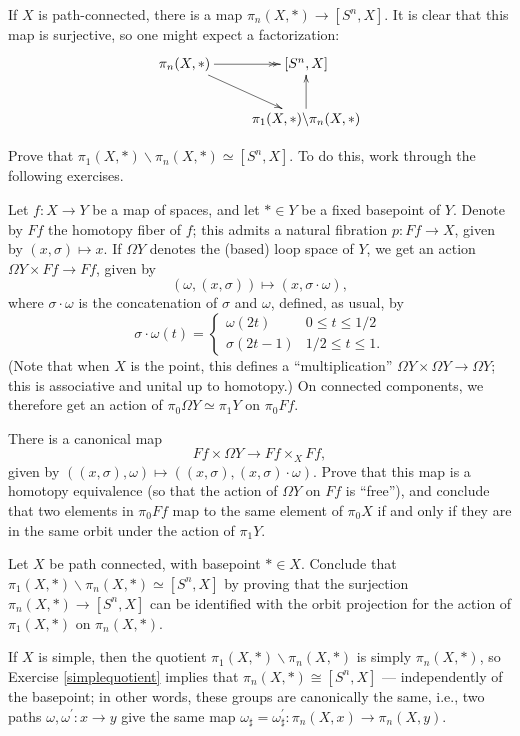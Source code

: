 If $X$ is path-connected, there is a map $\pi_n(X,\ast)\to [S^n,X]$.
It is clear that this map is surjective,
so one might expect a factorization:
\begin{equation*}
    \xymatrix{
	\pi_n(X,\ast)\ar@{->>}[r]\ar[dr] & [S^n,X]\\
	& \pi_1(X,\ast)\backslash \pi_n(X,\ast)\ar[u]
	}
\end{equation*}
\begin{exercise}\label{simplequotient}
    Prove that $\pi_1(X,\ast)\backslash \pi_n(X,\ast) \simeq [S^n, X]$.
    To do this, work through the following exercises.
    
    Let $f:X\to Y$ be a map of spaces, and let $\ast\in Y$ be a fixed basepoint of $Y$.
    Denote by $Ff$ the homotopy fiber of $f$; this admits a natural fibration $p:Ff \to X$, given by $(x,\sigma)\mapsto x$.
    If $\Omega Y$ denotes the (based) loop space of $Y$, we get an action $\Omega Y \times Ff \to Ff$, given by
    $$(\omega,(x,\sigma)) \mapsto (x,\sigma\cdot\omega),$$
    where $\sigma\cdot\omega$ is the concatenation of $\sigma$ and $\omega$, defined, as usual, by
    $$
    \sigma\cdot\omega(t) = \begin{cases}
	\omega(2t) & 0\leq t\leq 1/2\\
	\sigma(2t-1) & 1/2\leq t\leq 1.
    \end{cases}
    $$
    (Note that when $X$ is the point, this defines a ``multiplication'' $\Omega Y \times \Omega Y \to \Omega Y$; this is 
    associative and unital up to homotopy.)
    On connected components, we therefore get an action of $\pi_0\Omega Y \simeq \pi_1 Y$ on $\pi_0 Ff$.

    There is a canonical map
    $$Ff \times \Omega Y \to Ff\times_X Ff,$$
    given by $((x,\sigma),\omega) \mapsto ((x,\sigma),(x,\sigma)\cdot\omega)$.
    Prove that this map is a homotopy equivalence (so that the action of $\Omega Y$ on $Ff$ is ``free''), and conclude that
    two elements in $\pi_0 Ff$ map to the same element of $\pi_0 X$ if and only if they are in the same orbit under the action
    of $\pi_1 Y$.

    Let $X$ be path connected, with basepoint $\ast\in X$.
    Conclude that $\pi_1(X,\ast)\backslash \pi_n(X,\ast) \simeq [S^n,X]$ by proving that the surjection
    $\pi_n(X,\ast) \to [S^n,X]$ can be identified with the orbit projection for the action of $\pi_1(X,\ast)$ on $\pi_n(X,\ast)$.
\end{exercise}
If $X$ is simple, then the quotient $\pi_1(X,\ast)\backslash \pi_n(X,\ast)$ is simply $\pi_n(X, \ast)$, so
Exercise \ref{simplequotient} implies that $\pi_n(X,\ast)\cong [S^n,X]$ --- independently of the basepoint;
in other words, these groups are canonically the same, i.e., two paths $\omega,\omega^\prime:x\to y$ give the
same map $\omega_\sharp = \omega^\prime_\sharp:\pi_n(X,x)\to \pi_n(X,y)$.


